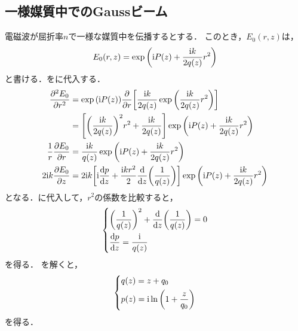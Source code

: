 \documentclass{report}
\begin{document}
      \subsection{一様媒質中でのGaussビーム}
        電磁波が屈折率$n$で一様な媒質中を伝播するとする．
        このとき，$E_0(r, z)$は，
        \begin{align}
          E_0(r, z) = \exp\qty(\mathrm{i} P(z) + \frac{\mathrm{i} k}{2q(z)}r^2) \label{condition-1-e0}
        \end{align}
        と書ける．をに代入する．
        \begin{align}
          \pdv[2]{E_0}{r} &= \exp\qty(\mathrm{i} P(z))\pdv{r}\qty[\frac{\mathrm{i} k}{2q(z)}\exp\qty(\frac{\mathrm{i} k}{2q(z)}r^2)] \\
          &= \qty[\qty(\frac{\mathrm{i} k}{2q(z)})^2r^2 + \frac{\mathrm{i} k}{2q(z)}]\exp\qty(\mathrm{i} P(z) + \frac{\mathrm{i} k}{2q(z)}r^2) \\
          \frac{1}{r}\pdv{E_0}{r} &= \frac{\mathrm{i} k}{q(z)}\exp\qty(\mathrm{i} P(z) + \frac{\mathrm{i} k}{2q(z)}r^2) \\ 
          2\mathrm{i} k\pdv{E_0}{z} &= 2\mathrm{i} k\qty[\mathrm{i} \dv{p}{z} + \frac{\mathrm{i} kr^2}{2}\dv{z}\qty(\frac{1}{q(z)})]\exp\qty(\mathrm{i} P(z) + \frac{\mathrm{i} k}{2q(z)}r^2) 
        \end{align}
        となる．に代入して，$r^2$の係数を比較すると，
        \begin{align}
          \begin{dcases}
            \qty(\frac{1}{q(z)})^2 + \dv{z}\qty(\frac{1}{q(z)}) = 0 \\
            \dv{p}{z} = \frac{\mathrm{i}}{q(z)}
          \end{dcases}\label{condition-2}
        \end{align}
        を得る．
        を解くと，
        \begin{align}
          \begin{dcases}
            q(z) = z + q_0 \\
            p(z) = \mathrm{i} \ln\qty(1 + \frac{z}{q_0})
          \end{dcases}
        \end{align}
        を得る．
    \section{}
  \appendix
\end{document}
